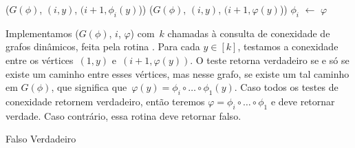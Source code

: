 \begin{algorithm}[htb]
\caption{\VPSPupdate($G(\phi)$, $i$, $\varphi$)}
\label{Algo:VPSPupdate}
\begin{algorithmic}[1]
  \State \dymGraphDelEdge($G(\phi)$, $(i,y)$, $(i+1,\phi_i(y)$))
\EndFor
{}
  \State \dymGraphAddEdge($G(\phi)$, $(i,y)$, $(i+1,\varphi(y)$))
\EndFor
\State $\phi_i$ $\gets$ $\varphi$ 
\end{algorithmic}
\end{algorithm}


Implementamos \VPSPverify($G(\phi)$, $i$, $\varphi$) com~$k$ chamadas à consulta de conexidade de grafos dinâmicos, feita pela rotina \dymGraphQuery{}. Para cada $y\in[k]$, testamos a conexidade entre os vértices~$(1,y)$ e~$(i+1,\varphi(y))$. O teste retorna verdadeiro se e só se existe um caminho entre esses vértices, mas nesse grafo, se existe um tal caminho em $G(\phi)$, que significa que~$\varphi(y) = \phi_i\circ\dots\circ\phi_1(y)$. Caso todos os testes de conexidade retornem verdadeiro, então teremos $\varphi = \phi_i\circ\dots\circ\phi_1$ e \VPSPverify{} deve retornar verdade. Caso contrário, essa rotina deve retornar falso. 

\begin{algorithm}[htb]
\caption{\VPSPverify($G(\phi)$, $i$, $\varphi$)}
\label{Algo:VPSPverify}
\begin{algorithmic}[1]
    \State \Return Falso
  \EndIf
\EndFor
\State \Return Verdadeiro
\end{algorithmic}
\end{algorithm}

